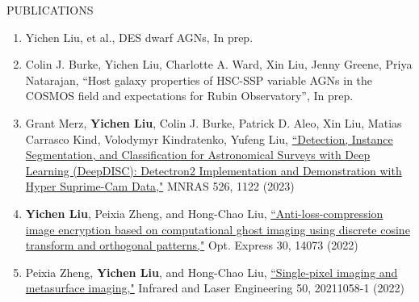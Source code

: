 \documentclass[10pt]{article} %
\begin{document}
\begin{section}{PUBLICATIONS}
    
\begin{enumerate}[leftmargin=1.5em]
    \item Yichen Liu, et al., DES dwarf AGNs, In prep.
    \item Colin J. Burke, Yichen Liu, Charlotte A. Ward, Xin Liu, Jenny Greene, Priya Natarajan, ``Host galaxy properties of HSC-SSP variable AGNs in the COSMOS field and expectations for Rubin Observatory'', In prep.
    \item Grant Merz, \textbf{Yichen Liu}, Colin J. Burke, Patrick D. Aleo, Xin Liu, Matias Carrasco Kind, Volodymyr Kindratenko, Yufeng Liu, \href{https://academic.oup.com/mnras/advance-article-abstract/doi/10.1093/mnras/stad2785/7273850?redirectedFrom=fulltext}{``Detection, Instance Segmentation, and Classification for Astronomical Surveys with Deep Learning (DeepDISC): Detectron2 Implementation and Demonstration with Hyper Suprime-Cam Data,"} MNRAS 526, 1122 (2023)
    \item \textbf{Yichen Liu}, Peixia Zheng, and Hong-Chao Liu, \href{https://opg.optica.org/oe/fulltext.cfm?uri=oe-30-9-14073&id=471300}{``Anti-loss-compression image encryption based on computational ghost imaging using discrete cosine transform and orthogonal patterns,"} Opt. Express 30, 14073 (2022)
    \item Peixia Zheng, \textbf{Yichen Liu}, and Hong-Chao Liu, \href{http://www.irla.cn/cn/article/doi/10.3788/IRLA20211058}{``Single-pixel imaging and metasurface imaging,"} Infrared and Laser Engineering 50, 20211058-1 (2022)
\end{enumerate}

\end{section}
\end{document}
